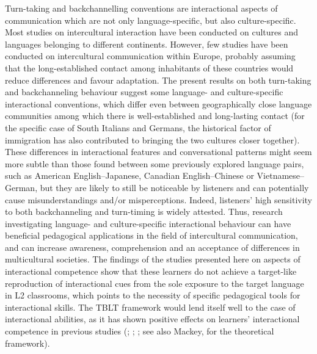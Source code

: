 \begin{stylecaption}
\textup{Turn-taking and backchannelling conventions are interactional aspects of communication which are not only language-specific, but also culture-specific. Most studies on intercultural interaction have been conducted on cultures and languages belonging to different continents. However, few studies have been conducted on intercultural communication within Europe, probably assuming that the long-established contact among inhabitants of these countries would reduce differences and favour adaptation. The present results on both turn-taking and backchanneling behaviour suggest some language- and culture-specific interactional conventions, which differ even between geographically close language communities among which there is well-established and long-lasting contact (for the specific case of South Italians and Germans, the historical factor of immigration has also contributed to bringing the two cultures closer together). These differences in interactional features and conversational patterns might seem more subtle than those found between some previously explored language pairs, such as American English–Japanese, Canadian English–Chinese or Vietnamese–German, but they are likely to still be noticeable by listeners and can potentially cause misunderstandings and/or misperceptions. Indeed, listeners’ high sensitivity to both backchanneling and turn-timing is widely attested. Thus, research investigating language- and culture-specific interactional behaviour can have beneficial pedagogical applications in the field of intercultural communication, and can increase awareness, comprehension and an acceptance of differences in multicultural societies. The findings of the studies presented here on aspects of interactional competence show that these learners do not achieve a target-like reproduction of interactional cues from the sole exposure to the target language in L2 classrooms, which points to the necessity of specific pedagogical tools for interactional skills. The TBLT framework would lend itself well to the case of interactional abilities, as it has shown positive effects on learners’ interactional competence in previous studies} \textup{(\citealt{Pérez2016}; \citealt{Waluyo2019}; \citealt{FangEtAl2021}; see also Mackey, \citealt{ZieglerBryfonski2016} for the theoretical framework)}.
\end{stylecaption}

